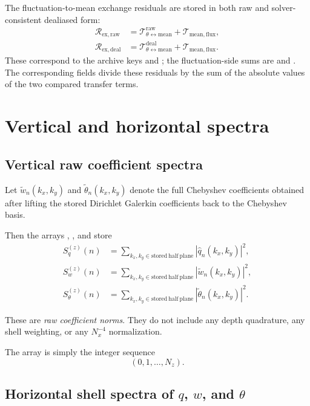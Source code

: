 \documentclass[11pt]{article}
\newcommand{\qhat}{\widehat{q}}
\begin{document}
The fluctuation-to-mean exchange residuals are stored in both raw and
solver-consistent dealiased form:
\begin{align*}
\mathcal{R}_{\mathrm{ex,raw}}
&=
\mathcal{T}_{\theta\leftrightarrow\mathrm{mean}}^{\mathrm{raw}}
+
\mathcal{T}_{\mathrm{mean,flux}},\\
\mathcal{R}_{\mathrm{ex,deal}}
&=
\mathcal{T}_{\theta\leftrightarrow\mathrm{mean}}^{\mathrm{deal}}
+
\mathcal{T}_{\mathrm{mean,flux}}.
\end{align*}
These correspond to the archive keys  and
; the fluctuation-side sums are
 and .
The corresponding  fields divide these residuals by the sum of the
absolute values of the two compared transfer terms.

\section{Vertical and horizontal spectra}

\subsection{Vertical raw coefficient spectra}

Let \(\widetilde{w}_n(k_x,k_y)\) and \(\widetilde{\theta}_n(k_x,k_y)\) denote
the full Chebyshev coefficients obtained after lifting the stored Dirichlet
Galerkin coefficients back to the Chebyshev basis.

Then the arrays
, , and 
store
\begin{align*}
S^{(z)}_q(n)
&=
\sum_{k_x,k_y \in \mathrm{stored\ half\ plane}}
|\qhat_n(k_x,k_y)|^2,\\
S^{(z)}_w(n)
&=
\sum_{k_x,k_y \in \mathrm{stored\ half\ plane}}
|\widetilde{w}_n(k_x,k_y)|^2,\\
S^{(z)}_{\theta}(n)
&=
\sum_{k_x,k_y \in \mathrm{stored\ half\ plane}}
|\widetilde{\theta}_n(k_x,k_y)|^2.
\end{align*}

These are \emph{raw coefficient norms}. They do not include any depth
quadrature, any shell weighting, or any \(N_x^{-4}\) normalization.

The array  is simply the integer sequence
\[
(0,1,\dots,N_z).
\]

\subsection{Horizontal shell spectra of \(q\), \(w\), and \(\theta\)}
\end{document}
